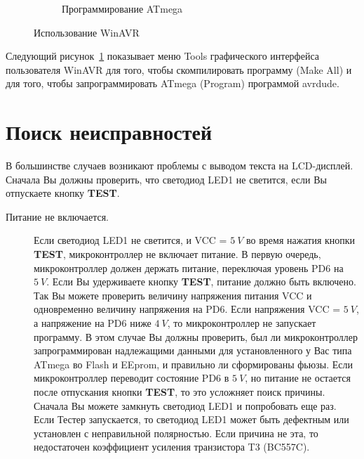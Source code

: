 \begin{figure}[H]
\begin{subfigure}[b]{.5\textwidth}
    \caption{Программирование ATmega}
  \end{subfigure}
  \caption{Использование WinAVR}
  \label{fig:WinAVR2}
\end{figure}
Следующий рисунок~\ref{fig:WinAVR2} показывает меню Tools графического интерфейса пользователя WinAVR для того, чтобы 
скомпилировать программу (Make All) и для того, чтобы запрограммировать ATmega (Program) программой avrdude.
\section{Поиск неисправностей }
В большинстве случаев возникают проблемы с выводом текста на LCD-дисплей. Сначала Вы должны проверить, что светодиод 
LED1 не светится, если Вы отпускаете кнопку \textbf{ TEST}. 
\begin{description}

\item[Питание не включается.]
Если светодиод LED1 не светится, и VCC = \(5~V\) во время нажатия кнопки \textbf{ TEST}, микроконтроллер не включает 
питание. 
В первую очередь, микроконтроллер должен держать питание, переключая уровень PD6 на \(5~V\). Если Вы удерживаете кнопку 
\textbf{ TEST}, питание должно быть включено.
Так Вы можете проверить величину напряжения питания VCC и одновременно величину 
напряжения на PD6. Если напряжения VCC = \(5~V\), а напряжение на PD6 ниже \(4~V\), то микроконтроллер не запускает программу. 
В этом случае Вы должны проверить, был ли микроконтроллер запрограммирован надлежащими данными для установленного у 
Вас типа ATmega во Flash и EEprom, и правильно ли сформированы фьюзы. Если микроконтроллер переводит состояние PD6 в 
\(5~V\), но питание не остается после отпускания кнопки \textbf{ TEST}, то это усложняет поиск причины. Сначала Вы можете замкнуть 
светодиод LED1 и попробовать еще раз. Если Тестер запускается, то светодиод LED1 может быть дефектным или установлен 
с неправильной полярностью. Если причина не эта, то недостаточен коэффициент усиления транзистора T3 (BC557C).


\end{description}
